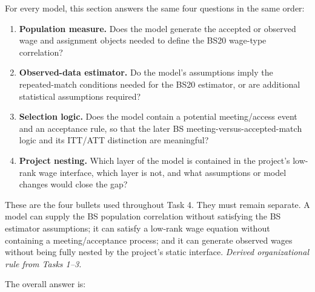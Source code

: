 \documentclass[11pt]{article}
\begin{document}
For every model, this section answers the same four questions in the same
order:

\begin{enumerate}
\item \textbf{Population measure.}  Does the model generate the accepted or
  observed wage and assignment objects needed to define the BS20 wage-type
  correlation?
\item \textbf{Observed-data estimator.}  Do the model's assumptions imply the
  repeated-match conditions needed for the BS20 estimator, or are additional
  statistical assumptions required?
\item \textbf{Selection logic.}  Does the model contain a potential
  meeting/access event and an acceptance rule, so that the later BS
  meeting-versus-accepted-match logic and its ITT/ATT distinction are
  meaningful?
\item \textbf{Project nesting.}  Which layer of the model is contained in the
  project's low-rank wage interface, which layer is not, and what assumptions
  or model changes would close the gap?
\end{enumerate}

These are the four bullets used throughout Task 4.  They must remain separate.
A model can supply the BS population correlation without satisfying the BS
estimator assumptions; it can satisfy a low-rank wage equation without
containing a meeting/acceptance process; and it can generate observed wages
without being fully nested by the project's static interface.
\textit{Derived organizational rule from Tasks 1--3.}

The overall answer is:
\end{document}
